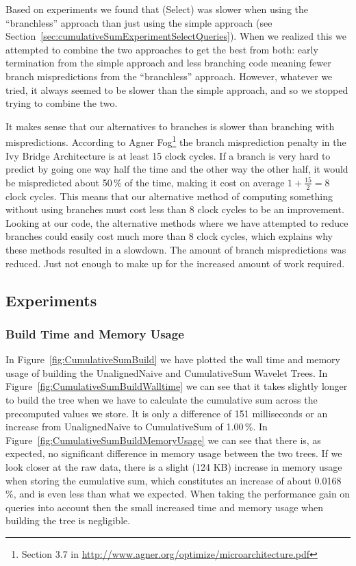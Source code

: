 Based on experiments we found that \textproc(Select) was slower when using the “branchless” approach than just using the simple approach (see Section~\ref{sec:cumulativeSumExperimentSelectQueries}).
When we realized this we attempted to combine the two approaches to get the best from both: early termination from the simple approach and less branching code meaning fewer branch mispredictions from the “branchless” approach.
However, whatever we tried, it always seemed to be slower than the simple approach, and so we stopped trying to combine the two.

It makes sense that our alternatives to branches is slower than branching with mispredictions.
According to Agner Fog\footnote{Section 3.7 in \url{http://www.agner.org/optimize/microarchitecture.pdf}} the branch misprediction penalty in the Ivy Bridge Architecture is at least 15 clock cycles.
If a branch is very hard to predict by going one way half the time and the other way the other half, it would be mispredicted about 50\,\% of the time, making it cost on average $1+\frac{15}{2}=8$ clock cycles.
This means that our alternative method of computing something without using branches must cost less than 8 clock cycles to be an improvement.
Looking at our code, the alternative methods where we have attempted to reduce branches could easily cost much more than 8 clock cycles, which explains why these methods resulted in a slowdown.
The amount of branch mispredictions was reduced. Just not enough to make up for the increased amount of work required.

\subsection{Experiments}

\subsubsection{Build Time and Memory Usage}
In Figure~\ref{fig:CumulativeSumBuild} we have plotted the wall time and memory usage of building the UnalignedNaive and CumulativeSum Wavelet Trees.
In Figure~\ref{fig:CumulativeSumBuildWalltime} we can see that it takes slightly longer to build the tree when we have to calculate the cumulative sum across the precomputed values we store.
It is only a difference of 151 milliseconds or an increase from UnalignedNaive to CumulativeSum of 1.00\,\%.
In Figure~\ref{fig:CumulativeSumBuildMemoryUsage} we can see that there is, as expected, no significant difference in memory usage between the two trees.
If we look closer at the raw data, there is a slight (124 KB) increase in memory usage when storing the cumulative sum, which constitutes an increase of about 0.0168\,\%, and is even less than what we expected.
When taking the performance gain on queries into account then the small increased time and memory usage when building the tree is negligible.


